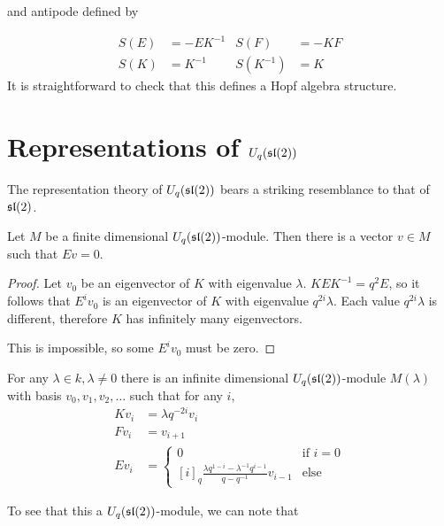and antipode defined by 

\begin{align}
    S(E) &= -EK^{-1} & S(F)      &= -KF \\
    S(K) &= K^{-1}   & S(K^{-1}) &= K 
\end{align}
It is straightforward to check that this defines a Hopf algebra structure. 

\section{Representations of $U_q(\mathfrak{sl}(2))$}

The representation theory of $U_q(\mathfrak{sl}(2))$ bears a striking resemblance to
that of $\mathfrak{sl}(2)$. 

\begin{claim}
    Let $M$ be a finite dimensional $U_q(\mathfrak{sl}(2))$-module. Then there is a
    vector $v \in M$ such that $Ev = 0$. 
\end{claim}


\begin{proof}
    Let $v_0$ be an eigenvector of $K$ with eigenvalue $\lambda$. $KEK^{-1} =
    q^2 E$, so it follows that $E^i v_0$ is an eigenvector of $K$ with
    eigenvalue $q^{2i}\lambda$. Each value $q^{2i}\lambda$ is different,
    therefore $K$ has infinitely many eigenvectors. 

    This is impossible, so some $E^i v_0$ must be zero.
\end{proof}

For any $\lambda \in k, \lambda \neq 0$ there is an infinite dimensional
$U_q(\mathfrak{sl}(2))$-module $M(\lambda)$ with basis $v_0, v_1, v_2, \ldots$ such that
for any $i$,
\begin{align}
    Kv_i &= \lambda q^{-2i}v_i \\
    Fv_i &= v_{i+1} \\
    Ev_i &= \begin{cases} 0 & \text{if $i = 0$} \\
                          [i]_q \frac{\lambda q^{1-i} - \lambda^{-1}q^{i-1}}{q - q^{-1}}v_{i-1} & \text{else}
            \end{cases}
\end{align}

To see that this a $U_q(\mathfrak{sl}(2))$-module, we can note that 


